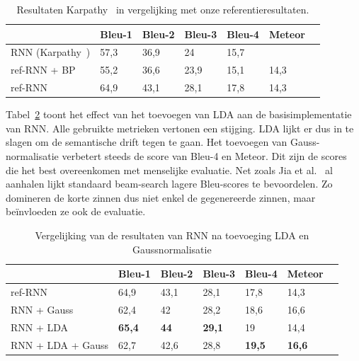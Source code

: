 \begin{table}
	\centering
	\begin{tabular}{lllllll}
		& Bleu-1 & Bleu-2 & Bleu-3 & Bleu-4 & Meteor \\ \hline
		RNN (Karpathy~\cite{Karpathy2015})    & 57,3   & 36,9   & 24     & 15,7   & ~           \\    
		ref-RNN + BP     & 55,2   & 36,6   & 23,9   & 15,1   & 14,3          \\
		ref-RNN          & 64,9  & 43,1     & 28,1   & 17,8   & 14,3          \\\hline
	\end{tabular}

	\caption{Resultaten Karpathy~\cite{Karpathy2015} in vergelijking met onze referentieresultaten.}
	\label{table:karpathy_met_bp}
\end{table}

Tabel~\ref{table:rnn_met_lda} toont het effect van het toevoegen van LDA aan de basisimplementatie van RNN. Alle gebruikte metrieken vertonen een stijging. LDA lijkt er dus in te slagen om de semantische drift tegen te gaan.
Het toevoegen van Gauss-normalisatie verbetert steeds de score van Bleu-4 en Meteor. Dit zijn de scores die het best overeenkomen met menselijke evaluatie. Net zoals Jia et al.~\cite{Fernando2015} al aanhalen lijkt standaard beam-search lagere Bleu-scores te bevoordelen. Zo domineren de korte zinnen dus niet enkel de gegenereerde zinnen, maar be\"invloeden ze ook de evaluatie.

\begin{table}
	\centering
	\begin{tabular}{lllllll}
		& Bleu-1 & Bleu-2 & Bleu-3 & Bleu-4 & Meteor \\ \hline
		ref-RNN        & 64,9   & 43,1   & 28,1   & 17,8   & 14,3          \\
		RNN + Gauss       & 62,4   & 42     & 28,2   & 18,6   & 16,6          \\
		RNN + LDA         & \textbf{65,4}   & \textbf{44}     & \textbf{29,1}   & 19     & 14,4          \\
		RNN + LDA + Gauss & 62,7   & 42,6   & 28,8   & \textbf{19,5}   & \textbf{16,6}          \\ \hline
	\end{tabular}
	\caption{Vergelijking van de resultaten van RNN na toevoeging LDA en Gaussnormalisatie}	
	\label{table:rnn_met_lda}
\end{table}

